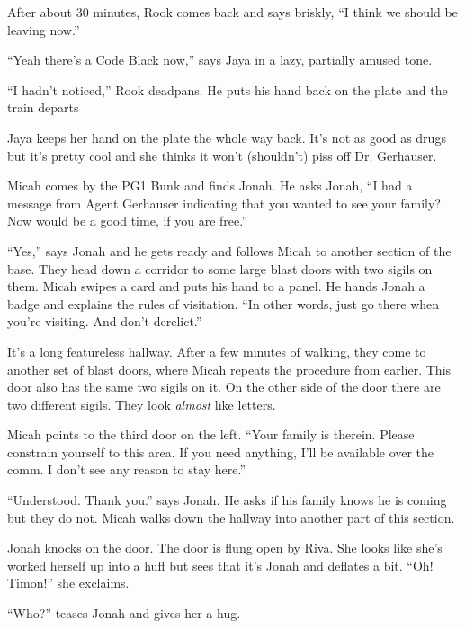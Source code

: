 After about 30 minutes, Rook comes back and says briskly, ``I think we should be leaving now.''

``Yeah there's a Code Black now,'' says Jaya in a lazy, partially amused tone.

``I hadn't noticed,'' Rook deadpans.  He puts his hand back on the plate and the train departs



Jaya keeps her hand on the plate the whole way back.  It's not as good as drugs but it's pretty cool and she thinks it won't (shouldn't) piss off Dr. Gerhauser.





Micah comes by the PG1 Bunk and finds Jonah.  He asks Jonah, ``I had a message from Agent Gerhauser indicating that you wanted to see your family?  Now would be a good time, if you are free.''

``Yes,'' says Jonah and he gets ready and follows Micah to another section of the base.  They head down a corridor to some large blast doors with two sigils on them.  Micah swipes a card and puts his hand to a panel.  He hands Jonah a badge and explains the rules of visitation.  ``In other words, just go there when you're visiting.  And don't derelict.''

It's a long featureless hallway.  After a few minutes of walking, they come to another set of blast doors, where Micah repeats the procedure from earlier.  This door also has the same two sigils on it.  On the other side of the door there are two different sigils.  They look \textit{almost} like letters.



Micah points to the third door on the left. ``Your family is therein.  Please constrain yourself to this area.  If you need anything, I'll be available over the comm.  I don't see any reason to stay here.''

``Understood.  Thank you.'' says Jonah.  He asks if his family knows he is coming but they do not.  Micah walks down the hallway into another part of this section.



Jonah knocks on the door.  The door is flung open by Riva.  She looks like she's worked herself up into a huff but sees that it's Jonah and deflates a bit.  ``Oh!  Timon!'' she exclaims.

``Who?'' teases Jonah and gives her a hug.

